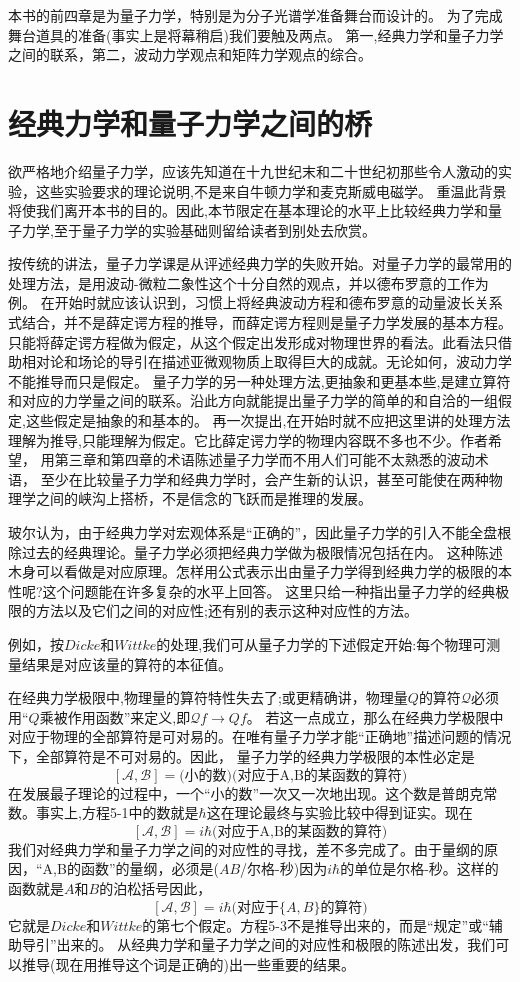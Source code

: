 本书的前四章是为量子力学，特别是为分子光谱学准备舞台而设计的。
为了完成舞台道具的准备(事实上是将幕稍启)我们要触及两点。
第一,经典力学和量子力学之间的联系，第二，波动力学观点和矩阵力学观点的综合。

\section{经典力学和量子力学之间的桥}
欲严格地介绍量子力学，应该先知道在十九世纪末和二十世纪初那些令人激动的实验，这些实验要求的理论说明,不是来自牛顿力学和麦克斯威电磁学。
重温此背景将使我们离开本书的目的。因此,本节限定在基本理论的水平上比较经典力学和量子力学,至于量子力学的实验基础则留给读者到别处去欣赏。

按传统的讲法，量子力学课是从评述经典力学的失败开始。对量子力学的最常用的处理方法，是用波动-微粒二象性这个十分自然的观点，并以德布罗意的工作为例。
在开始时就应该认识到，习惯上将经典波动方程和德布罗意的动量波长关系式结合，并不是薛定谔方程的推导，而薛定谔方程则是量子力学发展的基本方程。
只能将薛定谔方程做为假定，从这个假定出发形成对物理世界的看法。此看法只借助相对论和场论的导引在描述亚微观物质上取得巨大的成就。无论如何，波动力学不能推导而只是假定。
量子力学的另一种处理方法,更抽象和更基本些,是建立算符和对应的力学量之间的联系。沿此方向就能提出量子力学的简单的和自洽的一组假定,这些假定是抽象的和基本的。
再一次提出,在开始时就不应把这里讲的处理方法理解为推导,只能理解为假定。它比薛定谔力学的物理内容既不多也不少。作者希望， 用第三章和第四章的术语陈述量子力学而不用人们可能不太熟悉的波动术语，
至少在比较量子力学和经典力学时，会产生新的认识，甚至可能使在两种物理学之间的峡沟上搭桥，不是信念的飞跃而是推理的发展。

玻尔认为，由于经典力学对宏观体系是“正确的”，因此量子力学的引入不能全盘根除过去的经典理论。量子力学必须把经典力学做为极限情况包括在内。
这种陈述木身可以看做是对应原理。怎样用公式表示出由量子力学得到经典力学的极限的本性呢?这个问题能在许多复杂的水平上回答。
这里只给一种指出量子力学的经典极限的方法以及它们之间的对应性;还有别的表示这种对应性的方法。

例如，按$Dicke$和$Wittke$的处理,我们可从量子力学的下述假定开始:每个物理可测量结果是对应该量的算符的本征值。

在经典力学极限中,物理量的算符特性失去了;或更精确讲，物理量$Q$的算符$\mathscr{Q}$必须用“$Q$乘被作用函数”来定义,即$\mathscr{Q}f \rightarrow Qf$。
若这一点成立，那么在经典力学极限中对应于物理的全部算符是可对易的。在唯有量子力学才能“正确地”描述问题的情况下，全部算符是不可对易的。因此， 量子力学的经典力学极限的本性必定是
\[[\mathscr{A},\mathscr{B}]=\text{(小的数)(对应于A,B的某函数的算符)} \tag{5-1}\]
在发展最子理论的过程中，一个“小的数”一次又一次地出现。这个数是普朗克常数。事实上,方程5-1中的数就是$\hbar$这在理论最终与实验比较中得到证实。现在
\[[\mathscr{A},\mathscr{B}]=i\hbar\text{(对应于A,B的某函数的算符)} \tag{5-2}\]
我们对经典力学和量子力学之间的对应性的寻找，差不多完成了。由于量纲的原因，“A,B的函数”的量纲，必须是($AB$/尔格-秒)因为$i\hbar$的单位是尔格-秒。这样的函数就是$A$和$B$的泊松括号因此，
\[[\mathscr{A},\mathscr{B}]=i\hbar\text{(对应于$\{A,B\}$的算符)} \tag{5-3}\]
它就是$Dicke$和$Wittke$的第七个假定。方程5-3不是推导出来的，而是“规定”或“辅助导引”出来的。
从经典力学和量子力学之间的对应性和极限的陈述出发，我们可以推导(现在用推导这个词是正确的)出一些重要的结果。

